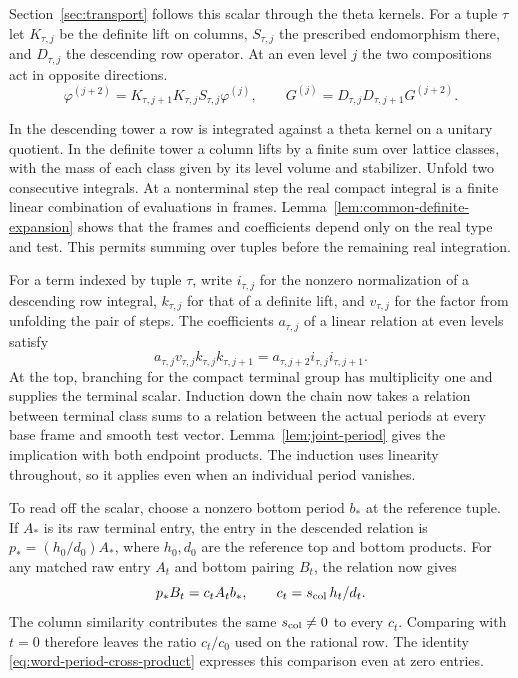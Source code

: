 Section~\ref{sec:transport} follows this scalar through the theta kernels. For a tuple \(\tau\) let \(K_{\tau,j}\) be the definite lift on columns, \(S_{\tau,j}\) the prescribed endomorphism there, and \(D_{\tau,j}\) the descending row operator. At an even level \(j\) the two compositions act in opposite directions.
\[
 \varphi^{(j+2)}=K_{\tau,j+1}K_{\tau,j}S_{\tau,j}\varphi^{(j)},
 \qquad G^{(j)}=D_{\tau,j}D_{\tau,j+1}G^{(j+2)} .
\]

In the descending tower a row is integrated against a theta kernel on a unitary quotient. In the definite tower a column lifts by a finite sum over lattice classes, with the mass of each class given by its level volume and stabilizer. Unfold two consecutive integrals. At a nonterminal step the real compact integral is a finite linear combination of evaluations in frames. Lemma~\ref{lem:common-definite-expansion} shows that the frames and coefficients depend only on the real type and test. This permits summing over tuples before the remaining real integration.

For a term indexed by tuple \(\tau\), write \(i_{\tau,j}\) for the nonzero normalization of a descending row integral, \(k_{\tau,j}\) for that of a definite lift, and \(v_{\tau,j}\) for the factor from unfolding the pair of steps. The coefficients \(a_{\tau,j}\) of a linear relation at even levels satisfy
\[
 a_{\tau,j}v_{\tau,j}k_{\tau,j}k_{\tau,j+1}
       =a_{\tau,j+2}i_{\tau,j}i_{\tau,j+1}.
\]
At the top, branching for the compact terminal group has multiplicity one and supplies the terminal scalar. Induction down the chain now takes a relation between terminal class sums to a relation between the actual periods at every base frame and smooth test vector. Lemma~\ref{lem:joint-period} gives the implication with both endpoint products. The induction uses linearity throughout, so it applies even when an individual period vanishes.

To read off the scalar, choose a nonzero bottom period \(b_*\) at
the reference tuple. If \(A_*\) is its raw terminal entry, the entry
in the descended relation is \(p_*=(h_0/d_0)A_*\), where \(h_0,d_0\)
are the reference top and bottom products. For any matched raw
entry \(A_t\) and bottom pairing \(B_t\), the relation now gives
\[
          p_* B_t=c_t A_t b_*,\qquad
          c_t=s_{\rm col}\,h_t/d_t .
\]
The column similarity contributes the same \(s_{\rm col}\ne0\) to every \(c_t\).
Comparing with \(t=0\) therefore leaves the ratio \(c_t/c_0\)
used on the rational row. The identity \eqref{eq:word-period-cross-product}
expresses this comparison even at zero entries.

